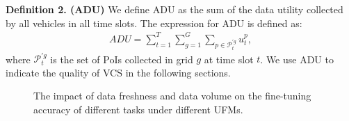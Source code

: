 






\noindent\textbf{Definition 2. (ADU)} We define ADU as the sum of the data utility collected by all vehicles in all time slots. The expression for ADU is defined as:
\begin{align}
ADU =  \sum\limits^{T}_{t=1} \sum\limits^{G}_{g=1} \sum\limits^{}_{p \in {\mathcal{P}}_t^{'g}} u_t^p,
\end{align}
where $\mathcal{P}_t^{'g}$ is the set of PoIs collected in grid $g$ at time slot $t$. We use ADU to indicate the quality of VCS in the following sections.

\begin{figure}[t]
\hspace{-1cm}  %
\caption{The impact of data freshness and data volume on the fine-tuning accuracy of different tasks under different UFMs.}
\label{fig: impact_on_fine-tune}
\end{figure}

